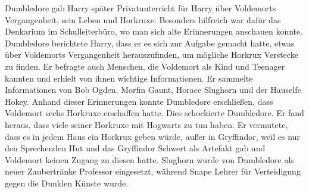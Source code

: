 \documentclass[a4paper, 10pt]{article}
\begin{document}
\vspace{10pt}
\newline
Dumbledore gab Harry später Privatunterricht für Harry über Voldemorts Vergangenheit, sein Leben und Horkruxe. Besonders hilfreich war dafür das Denkarium im Schulleiterbüro, wo man sich alte Erinnerungen anschauen konnte. Dumbledore berichtete Harry, dass er es sich zur Aufgabe gemacht hatte, etwas über Voldemorts Vergangenheit herauszufinden, um mögliche Horkrux Verstecke zu finden. Er befragte auch Menschen, die Voldemort als Kind und Teenager kannten und erhielt von ihnen wichtige Informationen.
\vspace{10pt}
\newline
Er sammelte Informationen von Bob Ogden, Morfin Gaunt, Horace Slughorn und der Hauselfe Hokey. Anhand dieser Erinnerungen konnte Dumbledore erschließen, dass Voldemort sechs Horkruxe erschaffen hatte. Dies schockierte Dumbledore. Er fand heraus, dass viele seiner Horkruxe mit Hogwarts zu tun haben. Er vermutete, dass es in jedem Haus ein Horkrux geben würde, außer in Gryffindor, weil es nur den Sprechenden Hut und das Gryffindor Schwert als Artefakt gab und Voldemort keinen Zugang zu diesen hatte. Slughorn wurde von Dumbledore als neuer Zaubertränke Professor eingesetzt, während Snape Lehrer für Verteidigung gegen die Dunklen Künste wurde.
\end{document}
